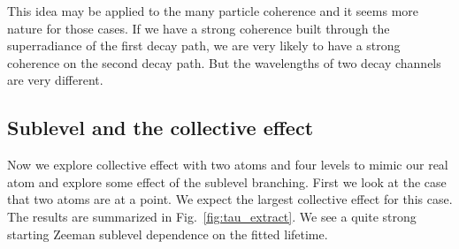 \documentclass{article}
\begin{document}
This idea may be applied to the many particle coherence and it seems more nature for those cases. If we have a strong coherence built through the superradiance of the first decay path, we are very likely to have a strong coherence on the second decay path. But the wavelengths of two decay channels are very different.

\subsection{Sublevel and the collective effect}
Now we explore collective effect with two atoms and four levels to mimic our real atom and explore some effect of the sublevel branching.  First we look at the case that two atoms are at a point. We expect the largest collective effect for this case. The results are summarized in Fig.~\ref{fig:tau_extract}. We see a quite strong starting Zeeman sublevel dependence on the fitted lifetime.
\end{document}
